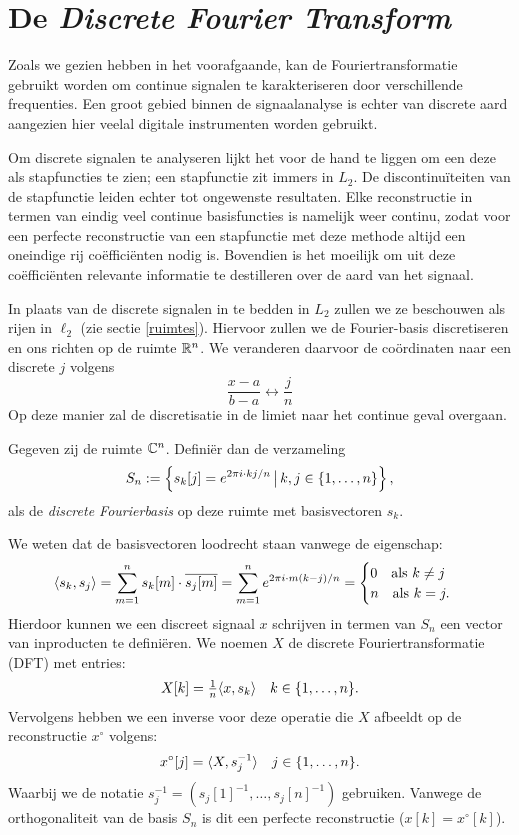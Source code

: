 \section{De \emph{Discrete Fourier Transform}}
Zoals we gezien hebben in het voorafgaande, kan de Fouriertransformatie gebruikt worden om continue signalen te karakteriseren door verschillende frequenties. 
Een groot gebied binnen de signaalanalyse is echter van discrete aard aangezien hier veelal digitale instrumenten worden gebruikt.

Om discrete signalen te analyseren lijkt het voor de hand te liggen om een deze als stapfuncties te zien;
een stapfunctie zit immers in $L_2$. De discontinu\"iteiten van de stapfunctie leiden echter tot ongewenste resultaten.
Elke reconstructie in termen van eindig veel continue basisfuncties is namelijk weer continu,
zodat voor een perfecte reconstructie van een stapfunctie met deze methode altijd een oneindige rij co\"effici\"enten nodig is. 
Bovendien is het moeilijk om uit deze co\"effici\"enten relevante informatie te destilleren over de aard van het signaal.

In plaats van de discrete signalen in te bedden in $L_2$ zullen we ze beschouwen als rijen in $\ell_2$ (zie sectie \ref{ruimtes}).
Hiervoor zullen we de Fourier-basis discretiseren en ons richten op de ruimte $\mathbb{R}^n$.
We veranderen daarvoor de co\"ordinaten naar een discrete $j$ volgens
\[
\frac{x-a}{b-a} \leftrightarrow \frac j n 
\]
Op deze manier zal de discretisatie in de limiet naar het continue geval overgaan. 

\begin{definitie} Gegeven zij de ruimte $\mathbb{C}^n$. Defini\"er dan de verzameling
\[
  S_n := \left\{ s_k [j] = e^{{2\pi i}\cdot k j/n } \,\big|\, k,j \in \{1, \ldots, n\} \right\},
\]
als de \emph{discrete Fourierbasis} op deze ruimte met basisvectoren $s_k$.
\end{definitie}
We weten dat de basisvectoren loodrecht staan vanwege de eigenschap:
\[
  \langle s_k , s_j \rangle = 
  \sum_{m=1}^n s_k[m]\cdot \overline{s_j[m]} = 
  \sum_{m=1}^n e^{{2\pi i}\cdot m (k-j)/n} =
  \begin{cases}
    0 \quad \text{als } k\neq j\\
    n \quad \text{als } k = j.
  \end{cases}
\]
Hierdoor kunnen we een discreet signaal $x$ schrijven in termen van $S_n$ 
een vector van inproducten te defini\"eren.
We noemen $X$ de discrete Fouriertransformatie (DFT) met entries:
\[
  X[k] = \tfrac{1}{n} \langle x , s_k \rangle \quad k\in\{1, \ldots ,n\}.
\]
Vervolgens hebben we een inverse voor deze operatie die $X$ afbeeldt op de reconstructie $x^\circ$ volgens:
\[
  x^\circ[j] = \langle X , s_j^{-1} \rangle \quad j\in \{1, \ldots, n\}.
\]
Waarbij we de notatie $s_j^{-1} = (s_j[1]^{-1},\ldots, s_j[n]^{-1})$ gebruiken.
Vanwege de orthogonaliteit van de basis $S_n$ is dit een perfecte reconstructie ($x[k] = x^\circ[k]$).

